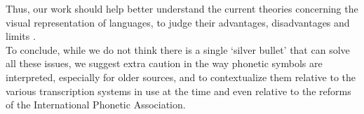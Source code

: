Thus, our work should help better understand the current theories concerning the visual representation of languages, to judge their advantages, disadvantages and limits \parencites{whitleyRhoticRepresentationProblems2003,eslingPhoneticNotation2010,andersonCrosslinguisticDatabasePhonetic2018}.  \\    

To conclude, while we do not think there is a single ‘silver bullet’ that can solve all these issues, we suggest extra caution in the way phonetic symbols are interpreted, especially for older sources, and to contextualize them relative to the various transcription systems in use at the time and even relative to the reforms of the International Phonetic Association.